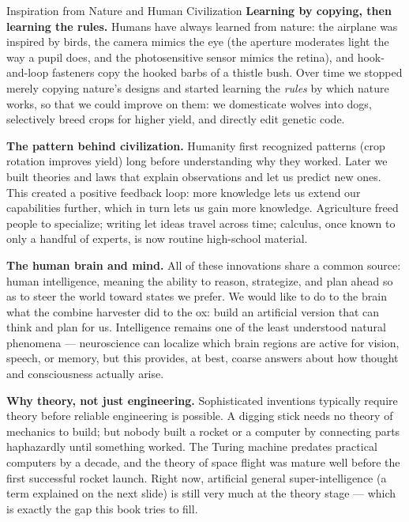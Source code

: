 \documentclass[aspectratio=169,10pt]{beamer}
\begin{document}
\begin{frame}[allowframebreaks]{Inspiration from Nature and Human Civilization}
  \textbf{Learning by copying, then learning the rules.} Humans have always
  learned from nature: the airplane was inspired by birds, the camera mimics
  the eye (the aperture moderates light the way a pupil does, and the
  photosensitive sensor mimics the retina), and hook-and-loop fasteners copy
  the hooked barbs of a thistle bush. Over time we stopped merely copying
  nature's designs and started learning the \emph{rules} by which nature
  works, so that we could improve on them: we domesticate wolves into dogs,
  selectively breed crops for higher yield, and directly edit genetic code.

  \vspace{0.3cm}
  \textbf{The pattern behind civilization.} Humanity first recognized
  patterns (crop rotation improves yield) long before understanding why they
  worked. Later we built theories and laws that explain observations and let
  us predict new ones. This created a positive feedback loop: more knowledge
  lets us extend our capabilities further, which in turn lets us gain more
  knowledge. Agriculture freed people to specialize; writing let ideas travel
  across time; calculus, once known to only a handful of experts, is now
  routine high-school material.

  \framebreak

  \textbf{The human brain and mind.} All of these innovations share a common
  source: human intelligence, meaning the ability to reason, strategize, and
  plan ahead so as to steer the world toward states we prefer. We would like
  to do to the brain what the combine harvester did to the ox: build an
  artificial version that can think and plan for us. Intelligence remains one
  of the least understood natural phenomena --- neuroscience can localize
  which brain regions are active for vision, speech, or memory, but this
  provides, at best, coarse answers about how thought and consciousness
  actually arise.

  \vspace{0.3cm}
  \textbf{Why theory, not just engineering.} Sophisticated inventions
  typically require theory before reliable engineering is possible. A digging
  stick needs no theory of mechanics to build; but nobody built a rocket or a
  computer by connecting parts haphazardly until something worked. The Turing
  machine predates practical computers by a decade, and the theory of space
  flight was mature well before the first successful rocket launch. Right
  now, artificial general super-intelligence (a term explained on the next
  slide) is still very much at the theory stage --- which is exactly the gap
  this book tries to fill.
\end{frame}
\end{document}
